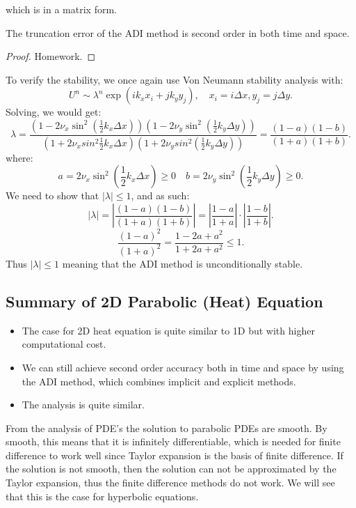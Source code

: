 \documentclass[../main/main.tex]{subfiles}
\begin{document}
which is in a matrix form.
\begin{remark}
   The truncation error of the ADI method is second order in both time and space. 
\end{remark}
\begin{proof}
    Homework. 
\end{proof}
To verify the stability, we once again use Von Neumann stability analysis with: \[
    U^n \sim \lambda^n \exp(ik_xx_i + j k_y y_j),\quad x_i = i\Delta x, y_j = j \Delta y
.\] Solving, we would get: \[
\lambda = \frac{(1-2\nu_x \sin^2 (\frac{1}{2}k_x \Delta x))(1-2\nu_y \sin^2 (\frac{1}{2}k_y \Delta y))}{(1+2\nu_x sin^2 \frac{1}{2}k_x \Delta x)(1+2\nu_y sin^2 (\frac{1}{2}k_y \Delta y))} = \frac{(1-a)(1-b)}{(1+a)(1+b)}
.\] where: \[
a = 2\nu_x \sin^2(\frac{1}{2}k_x \Delta x) \ge  0 \quad b = 2\nu_y \sin^2(\frac{1}{2}k_y \Delta y)\ge  0
.\] We need to show that $|\lambda| \le  1$, and as such: \[
|\lambda| = \left| \frac{(1-a)(1-b)}{(1+a)(1+b)} \right| = \left| \frac{1-a}{1+a} \right| \cdot  \left| \frac{1-b}{1+b} \right| 
.\] \[
\frac{(1-a)^2}{(1+a)^2} = \frac{1-2a + a^2}{1+2a + a^2} \le  1
.\] Thus $|\lambda| \le 1$ meaning that the ADI method is unconditionally stable.
\subsection{Summary of 2D Parabolic (Heat) Equation}
\begin{itemize}
    \item The case for 2D heat equation is quite similar to 1D but with higher computational cost.
    \item We can still achieve second order accuracy both in time and space by using the ADI method, which combines implicit and explicit methods.
    \item The analysis is quite similar.
\end{itemize}
\begin{remark}
    From the analysis of PDE's the solution to parabolic PDEs are smooth. By smooth, this means that it is infinitely differentiable, which is needed for finite difference to work well since Taylor expansion is the basis of finite difference. If the solution is not smooth, then the solution can not be approximated by the Taylor expansion, thus the finite difference methods do not work. We will see that this is the case for hyperbolic equations.
\end{remark}
\end{document}
